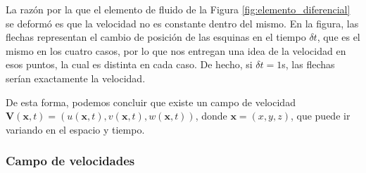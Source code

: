 La razón por la que el elemento de fluido de la Figura \ref{fig:elemento_diferencial} se deformó es que la velocidad no es constante dentro del mismo. 
En la figura, las flechas representan el cambio de posición de las esquinas en el tiempo $\delta t$, que es el mismo en los cuatro casos, por lo que nos entregan una idea de la velocidad en esos puntos, la cual es distinta en cada caso.
De hecho, si $\delta t=1$s, las flechas serían exactamente la velocidad. 

De esta forma, podemos concluir que existe un campo de velocidad $\mathbf{V}(\mathbf{x},t) = (u(\mathbf{x},t),v(\mathbf{x},t),w(\mathbf{x},t))$, donde $\mathbf{x}=(x,y,z)$, que puede ir variando en el espacio y tiempo.

\subsubsection*{Campo de velocidades}
